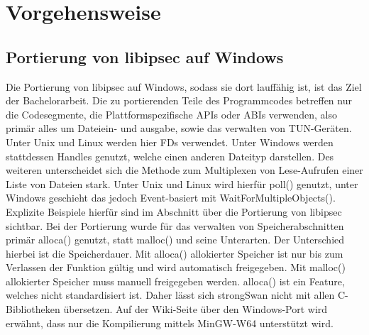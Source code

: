 



\section{Vorgehensweise}


\subsection{Portierung von libipsec auf Windows}
Die Portierung von libipsec auf Windows, sodass sie dort lauffähig ist, ist das Ziel
der Bachelorarbeit. Die zu portierenden Teile des Programmcodes betreffen nur
die Codesegmente, die Plattformspezifische \acp{API} oder \acp{ABI} verwenden,
also primär alles um Dateiein- und ausgabe, sowie das verwalten von TUN-Geräten.
Unter Unix und Linux werden hier \acp{FD} verwendet. Unter Windows werden stattdessen
Handles genutzt, welche einen anderen Dateityp darstellen. Des weiteren unterscheidet
sich die Methode zum Multiplexen von Lese-Aufrufen einer Liste von Dateien stark.
Unter Unix und Linux wird hierfür poll() genutzt, unter Windows geschieht das jedoch
Event-basiert mit WaitForMultipleObjects().
Explizite Beispiele hierfür sind im Abschnitt über die Portierung von libipsec sichtbar.
Bei der Portierung wurde für das verwalten von Speicherabschnitten 
primär alloca() genutzt, statt malloc() und seine Unterarten. Der Unterschied hierbei ist die
Speicherdauer. Mit alloca() allokierter Speicher ist nur bis zum Verlassen der Funktion gültig
und wird automatisch freigegeben. Mit malloc() allokierter Speicher muss manuell freigegeben werden.
alloca() ist ein Feature, welches nicht standardisiert ist.
Daher lässt sich strongSwan nicht mit allen C-Bibliotheken übersetzen.
Auf der Wiki-Seite über den Windows-Port wird erwähnt, dass nur die Kompilierung
mittels MinGW-W64 unterstützt wird.


